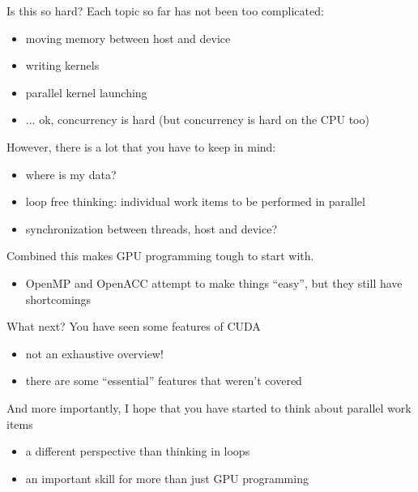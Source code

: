 \begin{frame}[fragile]{}
    \begin{info}{Is this so hard?}
        Each topic so far has not been too complicated:
        \begin{itemize}
            \item moving memory between host and device
            \item writing kernels
            \item parallel kernel launching
            \item ... ok, concurrency is hard (but concurrency is hard on the CPU too)
        \end{itemize}
        However, there is a lot that you have to keep in mind:
        \begin{itemize}
            \item where is my data?
            \item loop free thinking: individual work items to be performed in parallel
            \item synchronization between threads, host and device?
        \end{itemize}
        Combined this makes GPU programming tough to start with.
        \begin{itemize}
            \item OpenMP and OpenACC attempt to make things ``easy'', but they still have shortcomings
        \end{itemize}
    \end{info}

\end{frame}

\begin{frame}[fragile]{}
    \begin{info}{What next?}
        You have seen some features of CUDA
        \begin{itemize}
            \item not an exhaustive overview!
            \item there are some ``essential'' features that weren't covered
        \end{itemize}
        And more importantly, I hope that you have started to think about parallel work items
        \begin{itemize}
            \item a different perspective than thinking in loops
            \item an important skill for more than just GPU programming
        \end{itemize}
    \end{info}

\end{frame}

